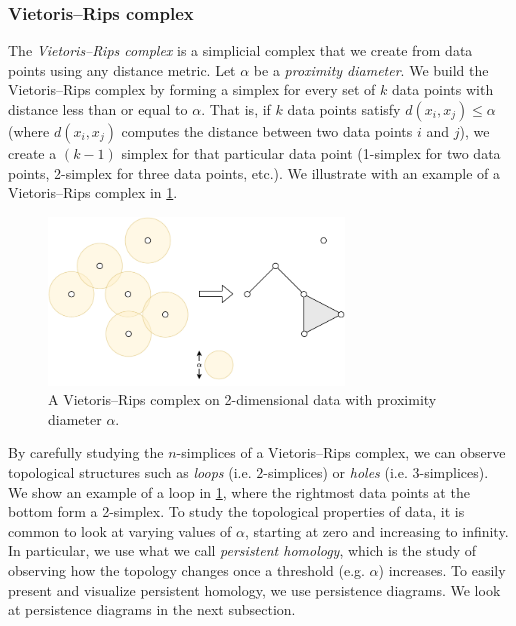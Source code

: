 \subsubsection{Vietoris–Rips complex}
\label{sec:vietoris-rips-complex}
The \textit{Vietoris–Rips complex} is a simplicial complex that we create from data points using any distance metric. Let $\alpha$ be a \textit{proximity diameter}. We build the Vietoris–Rips complex by forming a simplex for every set of $k$ data points with distance less than or equal to $\alpha$. That is, if $k$ data points satisfy $d(x_i, x_j) \leq \alpha$ (where $d(x_i, x_j)$ computes the distance between two data points $i$ and $j$), we create a $(k-1)$ simplex for that particular data point (1-simplex for two data points, 2-simplex for three data points, etc.). We illustrate with an example of a Vietoris–Rips complex in \cref{fig:simplicial-complex-rips}.
\begin{figure}[H]
    \centering
    \includegraphics[width=0.7\textwidth]{thesis/figures/simplicial-complex-rips_cropped.pdf}
    \caption{A Vietoris–Rips complex on 2-dimensional data with proximity diameter $\alpha$.}
    \label{fig:simplicial-complex-rips}
\end{figure}
By carefully studying the $n$-simplices of a Vietoris–Rips complex, we can observe topological structures such as \textit{loops} (i.e. $2$-simplices) or \textit{holes}  (i.e. $3$-simplices). We show an example of a loop in \cref{fig:simplicial-complex-rips}, where the rightmost data points at the bottom form a 2-simplex. To study the topological properties of data, it is common to look at varying values of $\alpha$, starting at zero and increasing to infinity. In particular, we use what we call \textit{persistent homology}, which is the study of observing how the topology changes once a threshold (e.g. $\alpha$) increases. To easily present and visualize persistent homology, we use persistence diagrams. We look at persistence diagrams in the next subsection.


